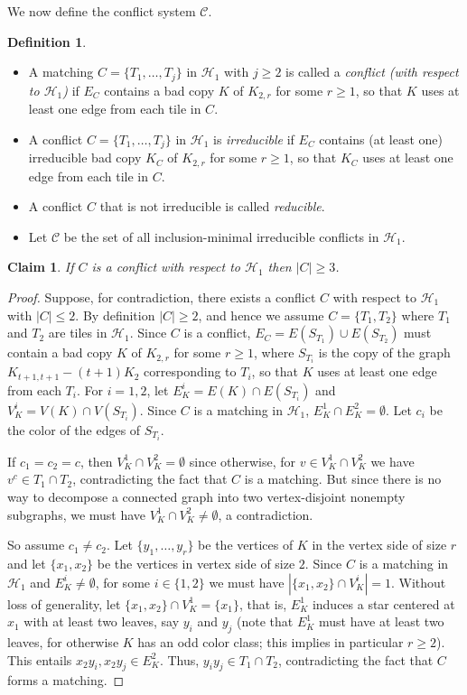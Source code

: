 \documentclass{article}
\newtheorem{claim}[theorem]{Claim}
\theoremstyle{definition}
\newtheorem{definition}[theorem]{Definition}
\newcommand\cH{{\mathcal H}}
\newcommand\cC{{\mathcal C}}
\begin{document}
We now define the conflict system $\cC$. 


\begin{definition}\hfill
\begin{itemize}
    \item A matching $C = \{T_1, \dots, T_j\}$  in $\cH_1$ with $j\ge 2$ is called a {\em conflict (with respect to $\mathcal{H}_1$)} if  $E_C$ contains a bad copy $K$ of  $K_{2,r}$ for some $r\ge 1$, so that $K$ uses at least one edge from each tile in $C$. 
 \item  A conflict $C = \{T_1, \dots, T_j\}$  in $\cH_1$ is  {\em irreducible} if $E_C$ contains (at least one) irreducible bad copy $K_C$ of  $K_{2,r}$ for some $r\ge 1$, so that $K_C$ uses at least one edge from each tile in $C$. 
\item A conflict  $C$ that is not irreducible is called {\em reducible}. 
 \item   Let $\cC$ be the set of all inclusion-minimal irreducible conflicts in $\cH_1$.
 \end{itemize}   
\end{definition}
\medskip
 
\begin{claim}\label{claim:conflictsize1}
If $C$ is a conflict with respect to $\mathcal{H}_1$ then $|C|\ge 3$.
\end{claim}
\begin{proof}
Suppose, for contradiction, there exists a conflict $C$ with respect to $\mathcal{H}_1$ with $|C|\leq 2$. By definition $|C|\geq 2$, and hence we assume $C = \{T_1,T_2\}$ where $T_1$ and $T_2$ are tiles in $\mathcal{H}_1$. Since $C$ is a conflict, $E_C = E(S_{T_1})\cup E(S_{T_2})$ must contain a bad copy $K$ of $K_{2,r}$ for some $r\geq 1$, where $S_{T_i}$ is the copy of the graph $K_{t+1,t+1}-(t+1)K_2$ corresponding to $T_i$, so that $K$ uses at least one edge from each $T_i$. For $i=1,2$, let $E_K^i=E(K)\cap E(S_{T_i})$ and  $V_K^i=V(K)\cap V(S_{T_i})$. Since $C$ is a matching in $\mathcal{H}_1$, $E_K^1\cap E_K^2=\emptyset$. Let $c_i$ be the color of the edges of $S_{T_i}$.


If $c_1 = c_2=c$, then $V_K^1\cap V_K^2=\emptyset$ since otherwise, for  $v\in V_K^1\cap V_K^2$ we have $v^c\in T_1\cap T_2$,  contradicting the fact that $C$ is a matching. But since there is no way to decompose a connected graph into two vertex-disjoint nonempty subgraphs, we must have $V_K^1\cap V_K^2\neq \emptyset$, a contradiction.

So assume $c_1\neq c_2$. Let $\{y_1,\dots,y_r\}$ be the vertices of $K$ in the vertex side of size $r$ and let $\{x_1,x_2\}$ be the vertices in vertex side of size $2$. Since $C$ is a matching in $\mathcal{H}_1$ and $E_K^i \neq \emptyset$, for some $i\in \{1,2\}$ we must have $|\{x_1,x_2\}\cap V_{K}^i|=1$. Without loss of generality, let $\{x_1,x_2\}\cap V_{K}^1 = \{x_1\}$, that is, $E_K^1$ induces a star centered at $x_1$ with at least two leaves, say $y_i$ and $y_j$ (note that $E_K^1$ must have at least two leaves, for otherwise $K$ has an odd color class;  this implies in particular $r\ge 2$). This entails $x_2y_i, x_2y_j \in E_K^2$. Thus, $y_iy_j\in T_1\cap T_2$, contradicting the fact that $C$ forms a matching.
\end{proof}
\end{document}
